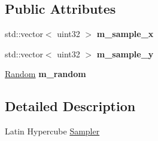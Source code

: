 \subsection*{\-Public \-Attributes}
\begin{DoxyCompactItemize}
\item 
\hypertarget{structnih_1_1_sampler_a4d60f1be8ce54fcd6eeab09f7fda1df3}{
std\-::vector$<$ uint32 $>$ {\bfseries m\-\_\-sample\-\_\-x}}
\label{structnih_1_1_sampler_a4d60f1be8ce54fcd6eeab09f7fda1df3}

\item 
\hypertarget{structnih_1_1_sampler_a00e98f2f8db653e2c4d85f20a4d2afae}{
std\-::vector$<$ uint32 $>$ {\bfseries m\-\_\-sample\-\_\-y}}
\label{structnih_1_1_sampler_a00e98f2f8db653e2c4d85f20a4d2afae}

\item 
\hypertarget{structnih_1_1_sampler_ad3baf65402d9be24ed8f4f1598be1162}{
\hyperlink{classnih_1_1_random}{\-Random} {\bfseries m\-\_\-random}}
\label{structnih_1_1_sampler_ad3baf65402d9be24ed8f4f1598be1162}

\end{DoxyCompactItemize}


\subsection{\-Detailed \-Description}
\-Latin \-Hypercube \hyperlink{structnih_1_1_sampler}{\-Sampler} 

